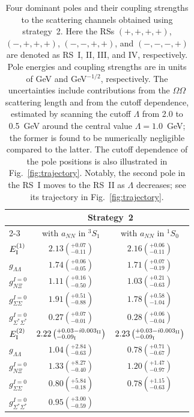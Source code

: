 \documentclass[prl,showpacs,twocolumn,superscriptaddress,floatfix,10pt,footinbib]{revtex4-2}
\begin{document}
\begin{table}[tb]
\centering
\caption{Four dominant poles and their coupling strengths to the scattering channels obtained using strategy~2. Here the RSs $(+,+,+,+)$, $(-,+,+,+)$, $(-,-,+,+)$, and $(-,-,-,+)$ are denoted as RS~I, II, III, and IV, respectively. Pole energies and coupling strengths are in units of GeV and GeV$^{-1/2}$, respectively. The uncertainties include contributions from the $\Omega\Omega$ scattering length and from the cutoff dependence, estimated by scanning the cutoff $\Lambda$ from 2.0 to 0.5~GeV around the central value $\Lambda=1.0$~GeV; the former is found to be numerically negligible compared to the latter. The cutoff dependence of the pole positions is also illustrated in Fig.~\ref{fig:trajectory}. Notably, the second pole in the RS~I moves to the RS~II as $\Lambda$ decreases; see its trajectory in Fig.~\ref{fig:trajectory}.}
\begin{tabular}{p{2em}cc}
\toprule
\multirow{2}{*}{} & \multicolumn{2}{c}{Strategy~2} \\
\cmidrule(lr){2-3}
&  with $a_{NN}$ in $^3S_1$ & with $a_{NN}$ in $^1S_0$ \\
\midrule
$E_{\rm I}^{(1)}$
& $2.13\left(^{+0.07}_{-0.11}\right)$
& $2.16\left(^{+0.06}_{-0.11}\right)$ \\[5pt]
$g_{\Lambda\Lambda}$
& $1.74\left(^{+0.06}_{-0.05}\right)$
& $1.71\left(^{+0.07}_{-0.19}\right)$ \\[5pt]
$g_{N\Xi}^{I=0}$
& $1.11\left(^{+0.16}_{-0.50}\right)$
& $1.03\left(^{+0.21}_{-0.63}\right)$ \\[5pt]
$g_{\Sigma\Sigma}^{I=0}$
& $1.91\left(^{+0.51}_{-0.88}\right)$
& $1.78\left(^{+0.58}_{-1.04}\right)$ \\[5pt]
$g_{\Sigma^*\Sigma^*}^{I=0}$
& $0.27\left(^{+0.07}_{-0.01}\right)$
& $0.28\left(^{+0.06}_{-0.04}\right)$ \\
\midrule
$E_{\rm I}^{(2)}$
& $2.22\left(^{+0.03-i0.003_{\rm II}}_{-0.09_{\rm I}}\right)$
& $2.23\left(^{+0.03-i0.003_{\rm II}}_{-0.09_{\rm I}}\right)$ \\[5pt]
$g_{\Lambda\Lambda}$
& $1.04\left(^{+2.84}_{-0.63}\right)$
& $0.78\left(^{+0.71}_{-0.67}\right)$ \\[5pt]
$g_{N\Xi}^{I=0}$
& $1.33\left(^{+8.27}_{-0.40}\right)$
& $1.20\left(^{+1.47}_{-0.97}\right)$ \\[5pt]
$g_{\Sigma\Sigma}^{I=0}$
& $0.80\left(^{+5.84}_{-0.18}\right)$
& $0.78\left(^{+1.15}_{-0.63}\right)$ \\[5pt]
$g_{\Sigma^*\Sigma^*}^{I=0}$
& $0.95\left(^{+3.00}_{-0.59}\right)$

\end{tabular}
\end{table}
\end{document}
